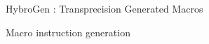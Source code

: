 \begin{Frame}{HybroGen : Transprecision Generated Macros}
  \begin{block}{Macro instruction generation}
    
  \end{block}
\end{Frame}
